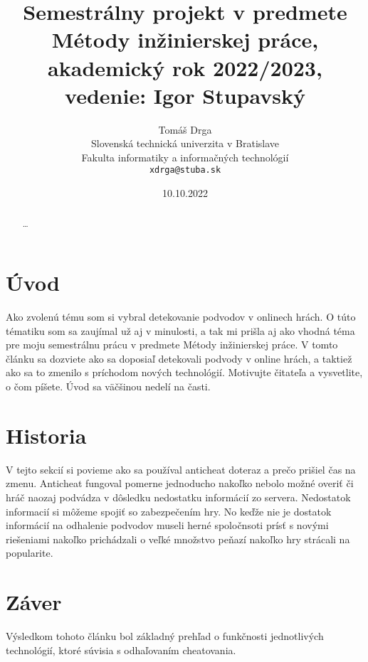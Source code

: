 \documentclass[10pt,twoside,slovak,a4paper]{article}
\title{Semestrálny projekt v predmete Métody inžinierskej práce, akademický rok 2022/2023, vedenie: Igor Stupavský}
\author{Tomáš Drga\\[2pt]
	{\small Slovenská technická univerzita v Bratislave}\\
	{\small Fakulta informatiky a informačných technológií}\\
	{\small \texttt{xdrga@stuba.sk}}
	}
\date{\small 10.10.2022}
\begin{document}
\maketitle

\begin{abstract}
\ldots
\end{abstract}

\section{Úvod}

Ako zvolenú tému som si vybral detekovanie podvodov v onlinech hrách. O túto tématiku som sa zaujímal už aj v minulosti, a tak mi prišla aj ako vhodná téma pre moju semestrálnu prácu v predmete Métody inžinierskej práce. V tomto článku sa dozviete ako sa doposiaľ detekovali podvody v online hrách, a taktiež ako sa to zmenilo s príchodom nových technológií.
Motivujte čitateľa a vysvetlite, o čom píšete. Úvod sa väčšinou nedelí na časti.

\section{Historia}

V tejto sekcií si povieme ako sa používal anticheat doteraz a prečo prišiel čas na zmenu. Anticheat fungoval pomerne jednoducho nakoľko nebolo možné overiť či hráč naozaj podvádza v dôsledku nedostatku informácií zo servera. Nedostatok informacií si môžeme spojiť so zabezpečením hry. No keďže nie je dostatok informácií na odhalenie podvodov museli herné spoločnsoti prísť s novými riešeniami nakoľko prichádzali o veľké množstvo peňazí nakoľko hry strácali na popularite.

\section{Záver} \label{zaver}
Výsledkom tohoto článku bol základný prehľad o funkčnosti jednotlivých technológií, ktoré súvisia s odhaľovaním cheatovania.

\cite{PLP-Framework}


\end{document}
